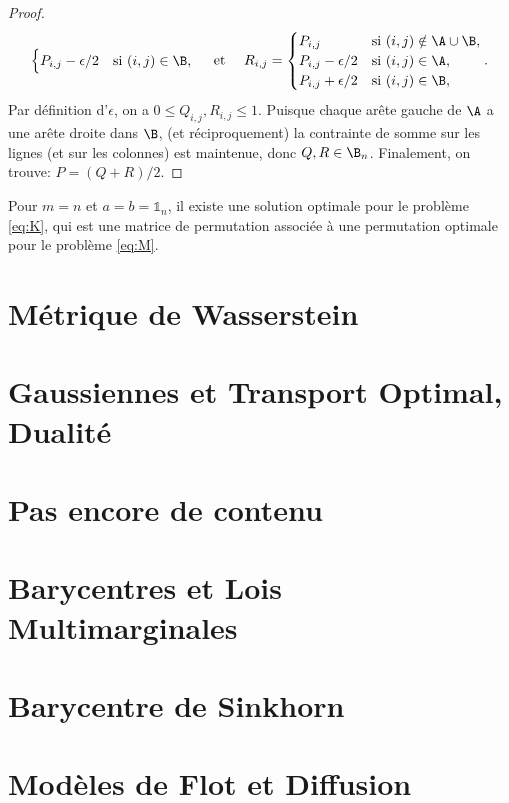 \documentclass[info, math, french]{mpb-cours}
\begin{document}
\begin{proof}
\begin{equation*}
\begin{cases}
			P_{i,j}-\epsilon/2 & \text{si } (i,j) \in \B,
		\end{cases}
		\quad \text{ et }\quad
		R_{i,j} =
		\begin{cases}
			P_{i,j}            & \text{si } (i,j) \notin \A \cup \B, \\
			P_{i,j}-\epsilon/2 & \text{si } (i,j) \in \A,            \\
			P_{i,j}+\epsilon/2 & \text{si } (i,j) \in \B,
		\end{cases}.
	\end{equation*}
	Par définition d'$\epsilon$, on a $0 \leq Q_{i,j}, R_{i,j} \leq 1$.
	Puisque chaque arête gauche de $\A$ a une arête droite dans $\B$, (et réciproquement) la
	contrainte de somme sur les lignes (et sur les colonnes) est maintenue, donc $Q,R \in \B_n$. Finalement, on trouve: $P=(Q+R)/2$.
\end{proof}

\begin{corollaire}
	Pour $m = n$ et $a = b = \mathds{1}_{n}$, il existe une solution optimale pour le problème \ref{eq:K}, qui est une matrice de permutation associée à une permutation optimale pour le problème \ref{eq:M}.
\end{corollaire}

\section{Métrique de Wasserstein}

\section{Gaussiennes et Transport Optimal, Dualité}

\section{Pas encore de contenu}

\section{Barycentres et Lois Multimarginales}

\section{Barycentre de Sinkhorn}

\section{Modèles de Flot et Diffusion}
\end{document}
